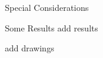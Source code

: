 

\begin{frame}

\end{frame}


\begin{frame}
\vspace{-0.5cm}
{\large \hspace{3mm} Special Considerations}

\end{frame}

\begin{frame}
\vspace{-0.5cm}
{\large \hspace{3mm} Some Results}
add results
\end{frame}

\begin{frame}
add drawings
\end{frame}



